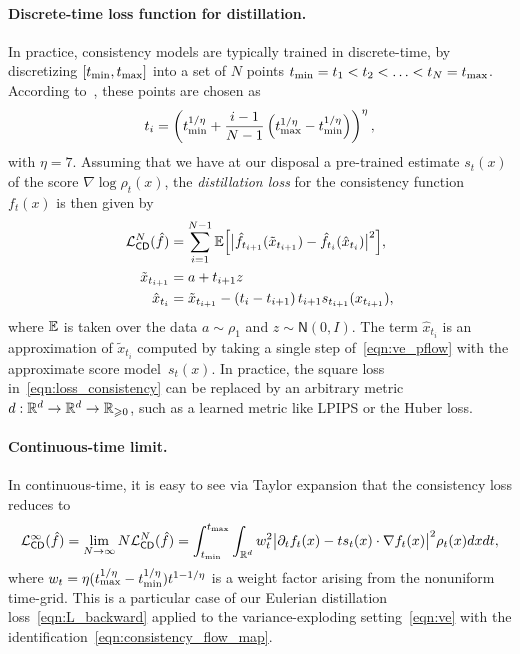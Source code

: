\paragraph{Discrete-time loss function for distillation.}
In practice, consistency models are typically trained in discrete-time, by discretizing $[t_{\min}, t_{\max}]$ into a set of $N$ points $t_{\min} = t_1 < t_2 < \hdots < t_N = t_{\max}$.
%
According to~\citet{karras_elucidating_2022}, these points are chosen as
\begin{equation}
	\label{eqn:t_disc}
	t_i = \left(t_{\min}^{1/\eta} + \frac{i-1}{N-1}\left(t_{\max}^{1/\eta} - t_{\min}^{1/\eta}\right)\right)^\eta,
\end{equation}
with $\eta = 7$. Assuming that we have at our disposal a pre-trained estimate $s_t(x)$ of the score $\nabla \log \rho_t(x)$, the \textit{distillation loss} for the consistency function $f_t(x)$ is then given by
\begin{equation}
	\label{eqn:loss_consistency}
	\begin{aligned}
		\mathcal{L}_{\mathsf{CD}}^N(\hat f) & = \sum_{i=1}^{N-1} \mathbb{E}\Big[\big|\hat f_{t_{i+1}}(\tilde x_{t_{i+1}}) - \hat f_{t_i}(\hat{x}_{t_i})\big|^2\Big], \\
		\tilde x_{t_{i+1}}            & = a + t_{i+1}z                                                                                                 \\
		\hat{x}_{t_i}                 & = \tilde x_{t_{i+1}} - \left(t_{i} - t_{i+1}\right)t_{i+1}s_{t_{i+1}} (x_{t_{i+1}}),
	\end{aligned}
\end{equation}
where  $\mathbb{E}$ is taken over the data $a \sim \rho_1$ and $z \sim \mathsf N(0, I)$.
The term $\hat{x}_{t_i}$ is an approximation of $\tilde x_{t_i}$ computed by taking a single step of~\eqref{eqn:ve_pflow} with the approximate score model~$s_t(x)$. In practice, the square loss in~\eqref{eqn:loss_consistency} can be replaced by an arbitrary metric $d:\mathbb{R}^d\rightarrow\mathbb{R}^d\rightarrow\mathbb{R}_{\geqslant 0}$, such as a learned metric like LPIPS or the Huber loss.



\paragraph{Continuous-time limit.}
In continuous-time, it is easy to see via Taylor expansion that the consistency loss reduces to
\begin{equation}
	\label{eqn:CD_continuous}
	\mathcal{L}^\infty_{\mathsf{CD}}(\hat f) = \lim_{N\to\infty} N \mathcal{L}_{\mathsf{CD}}^N(\hat f) =\int_{t_{\min}}^{t_{\max}}\int_{\mathbb{R}^d} w^2_t \big|\partial_t f_t(x) - t s_t(x)\cdot \nabla f_t(x)\big|^2\rho_t(x)dxdt,
\end{equation}
where $w_t = \eta (t_{\max}^{1/\eta}-t_{\min}^{1/\eta}) t^{1-1/\eta}$ is a weight factor arising from the nonuniform time-grid.
%
This is a particular case of our Eulerian distillation loss~\eqref{eqn:L_backward} applied to the variance-exploding setting~\eqref{eqn:ve} with the identification~\eqref{eqn:consistency_flow_map}.



